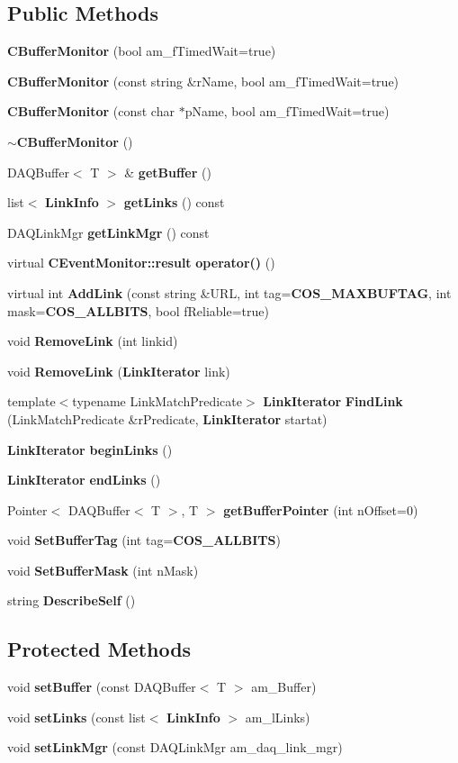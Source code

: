\subsection*{Public Methods}
\begin{CompactItemize}
\item 
{\bf CBuffer\-Monitor} (bool am\_\-f\-Timed\-Wait=true)
\item 
{\bf CBuffer\-Monitor} (const string \&r\-Name, bool am\_\-f\-Timed\-Wait=true)
\item 
{\bf CBuffer\-Monitor} (const char $\ast$p\-Name, bool am\_\-f\-Timed\-Wait=true)
\item 
{\bf $\sim$CBuffer\-Monitor} ()
\item 
DAQBuffer$<$ T $>$ \& {\bf get\-Buffer} ()
\item 
list$<$ {\bf Link\-Info} $>$ {\bf get\-Links} () const
\item 
DAQLink\-Mgr {\bf get\-Link\-Mgr} () const
\item 
virtual {\bf CEvent\-Monitor::result} {\bf operator()} ()
\item 
virtual int {\bf Add\-Link} (const string \&URL, int tag={\bf COS\_\-MAXBUFTAG}, int mask={\bf COS\_\-ALLBITS}, bool f\-Reliable=true)
\item 
void {\bf Remove\-Link} (int linkid)
\item 
void {\bf Remove\-Link} ({\bf Link\-Iterator} link)
\item 
template$<$typename Link\-Match\-Predicate$>$ {\bf Link\-Iterator} {\bf Find\-Link} (Link\-Match\-Predicate \&r\-Predicate, {\bf Link\-Iterator} startat)
\item 
{\bf Link\-Iterator} {\bf begin\-Links} ()
\item 
{\bf Link\-Iterator} {\bf end\-Links} ()
\item 
Pointer$<$ DAQBuffer$<$ T $>$, T $>$ {\bf get\-Buffer\-Pointer} (int n\-Offset=0)
\item 
void {\bf Set\-Buffer\-Tag} (int tag={\bf COS\_\-ALLBITS})
\item 
void {\bf Set\-Buffer\-Mask} (int n\-Mask)
\item 
string {\bf Describe\-Self} ()
\end{CompactItemize}
\subsection*{Protected Methods}
\begin{CompactItemize}
\item 
void {\bf set\-Buffer} (const DAQBuffer$<$ T $>$ am\_\-Buffer)
\item 
void {\bf set\-Links} (const list$<$ {\bf Link\-Info} $>$ am\_\-l\-Links)
\item 
void {\bf set\-Link\-Mgr} (const DAQLink\-Mgr am\_\-daq\_\-link\_\-mgr)
\end{CompactItemize}
